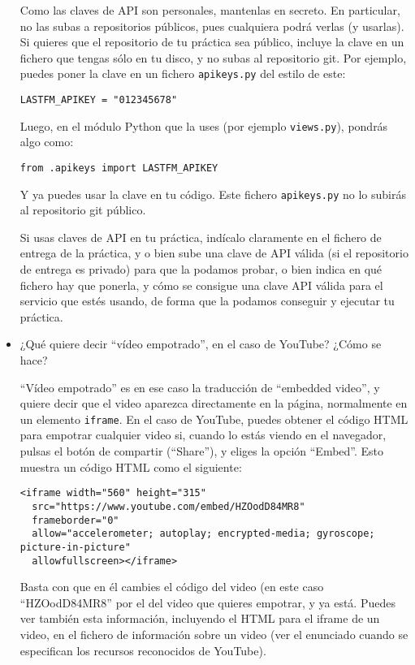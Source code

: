 \begin{itemize}
  Como las claves de API son personales, mantenlas en secreto. En particular, no las subas a repositorios públicos, pues cualquiera podrá verlas (y usarlas). Si quieres que el repositorio de tu práctica sea público, incluye la clave en un fichero que tengas sólo en tu disco, y no subas al repositorio git. Por ejemplo, puedes poner la clave en un fichero \verb|apikeys.py| del estilo de este:

\begin{verbatim}
LASTFM_APIKEY = "012345678"
\end{verbatim}

Luego, en el módulo Python que la uses (por ejemplo \verb|views.py|), pondrás algo como:

\begin{verbatim}
from .apikeys import LASTFM_APIKEY
\end{verbatim}

Y ya puedes usar la clave en tu código. Este fichero \verb|apikeys.py| no lo subirás al repositorio git público.

Si usas claves de API en tu práctica, indícalo claramente en el fichero de entrega de la práctica, y o bien sube una clave de API válida (si el repositorio de entrega es privado) para que la podamos probar, o bien indica en qué fichero hay que ponerla, y cómo se consigue una clave API válida para el servicio que estés usando, de forma que la podamos conseguir y ejecutar tu práctica.

  
\item ¿Qué quiere decir ``vídeo empotrado'', en el caso de YouTube? ¿Cómo se hace?

  ``Vídeo empotrado'' es en ese caso la traducción de ``embedded video'', y quiere decir que el video aparezca directamente en la página, normalmente en un elemento \verb|iframe|. En el caso de YouTube, puedes obtener el código HTML para empotrar cualquier video si, cuando lo estás viendo en el navegador, pulsas el botón de compartir (``Share''), y eliges la opción ``Embed''. Esto muestra un código HTML como el siguiente:

\begin{verbatim}
<iframe width="560" height="315"
  src="https://www.youtube.com/embed/HZOodD84MR8"
  frameborder="0"
  allow="accelerometer; autoplay; encrypted-media; gyroscope; picture-in-picture"
  allowfullscreen></iframe>
\end{verbatim}

Basta con que en él cambies el código del video (en este caso ``HZOodD84MR8''  por el del video que quieres empotrar, y ya está. Puedes ver también esta información, incluyendo el HTML para el iframe de un video, en el fichero de información sobre un video (ver el enunciado cuando se especifican los recursos reconocidos de YouTube).
  

\end{itemize}
